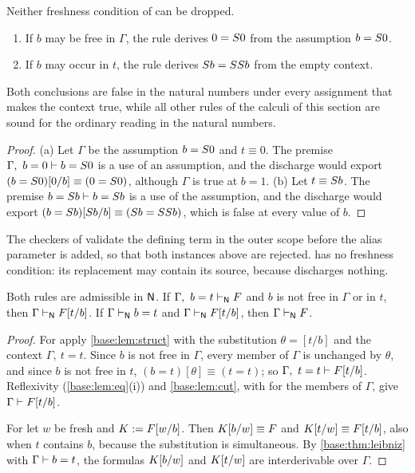 \begin{proposition}
\label{disch:prop:alias-fresh}
Neither freshness condition of  can be dropped.
\begin{enumerate}[label=\textup{(\alph*)}]
\item If $b$ may be free in $\Gamma$, the rule derives $0=S 0$ from the
 assumption $b=S 0$.
\item If $b$ may occur in $t$, the rule derives $S b=SS b$ from
 the empty context.
\end{enumerate}
Both conclusions are false in the natural numbers under every assignment
that makes the context true, while all other rules of the calculi of this
section are sound for the ordinary reading in the natural numbers.
\end{proposition}

\begin{proof}
(a) Let $\Gamma$ be the assumption $b=S 0$ and $t\equiv 0$. The premise
$\Gamma,\ b=0\vdash b=S 0$ is a use of an assumption, and the discharge
would export $(b=S 0)[0/b]\equiv(0=S 0)$, although $\Gamma$ is
true at $b=1$. (b) Let $t\equiv S b$. The premise
$b=S b\vdash b=S b$ is a use of the assumption, and the discharge
would export $(b=S b)[S b/b]\equiv(S b=SS b)$, which
is false at every value of $b$.
\end{proof}

The checkers of  validate the defining term in the outer
scope before the alias parameter is added, so that both instances above are
rejected.  has no freshness condition: its replacement may
contain its source, because  discharges nothing.

\begin{lemma}
\label{disch:lem:alias-sound}
Both rules are admissible in $\mathsf{N}$. If $\Gamma,\ b=t\vdash_{\mathsf{N}}F$ and
$b$ is not free in $\Gamma$ or in $t$, then
$\Gamma\vdash_{\mathsf{N}}F[t/b]$. If $\Gamma\vdash_{\mathsf{N}}b=t$ and
$\Gamma\vdash_{\mathsf{N}}F[t/b]$, then $\Gamma\vdash_{\mathsf{N}}F$.
\end{lemma}

\begin{proof}
For  apply \cref{base:lem:struct} with the substitution
$\theta=[t/b]$ and the context $\Gamma,\ t=t$. Since $b$ is not free in
$\Gamma$, every member of $\Gamma$ is unchanged by $\theta$, and since $b$
is not free in $t$, $(b=t)[\theta]\equiv(t=t)$; so
$\Gamma,\ t=t\vdash F[t/b]$. Reflexivity
(\cref{base:lem:eq}(i)) and \cref{base:lem:cut}, with  for
the members of $\Gamma$, give $\Gamma\vdash F[t/b]$.

For  let $w$ be fresh and $K\mathrel{:=} F[w/b]$. Then
$K[b/w]\equiv F$ and $K[t/w]\equiv F[t/b]$, also when
$t$ contains $b$, because the substitution is simultaneous. By
\cref{base:thm:leibniz} with $\Gamma\vdash b=t$, the formulas
$K[b/w]$ and $K[t/w]$ are interderivable over $\Gamma$.
\end{proof}

